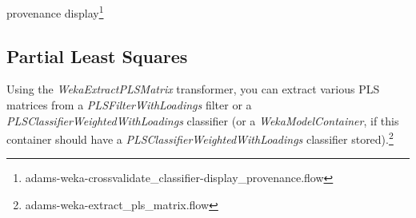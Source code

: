 provenance
display\footnote{adams-weka-crossvalidate\_classifier-display\_provenance.flow}

\subsection{Partial Least Squares}
Using the \textit{WekaExtractPLSMatrix} transformer, you can extract various
PLS matrices from a \textit{PLSFilterWithLoadings} filter or a 
\textit{PLSClassifierWeightedWithLoadings} classifier (or a \textit{WekaModelContainer},
if this container should have a \textit{PLSClassifierWeightedWithLoadings} classifier 
stored).\footnote{adams-weka-extract\_pls\_matrix.flow}
